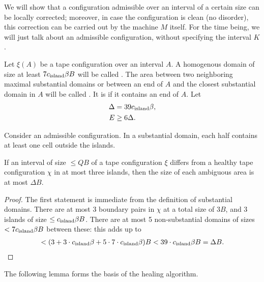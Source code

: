 \documentclass[11pt]{memoir}
\theoremstyle{definition} %
\renewcommand{\le}{\leq}
\renewcommand{\ge}{\geq}
\def\B{B}
\newcommand{\E}{E}
\newcommand{\Q}{Q}
\newcommand{\cns}[1]{c_{\textrm{\upshape #1}}}
\begin{document}
We will show that a configuration admissible over an interval of a certain size can be locally corrected;
moreover, in case the configuration is clean (no disorder), this correction
can be carried out by the machine \( M \) itself.
For the time being, we will just talk about an admissible configuration, without specifying the interval
\( K \).

\begin{definition}\label{def:substantial}
Let \( \xi(A) \) be a tape configuration over an interval \( A \).
A homogenous domain of size at least \( 7\cns{island}\beta\B \)
will be called .
The area between two neighboring maximal
substantial domains or between an end of \( A \) and the closest substantial domain in \( A \)
will be called .
It is  if it contains an end of \( A \).
  Let
 \begin{align*}
     \Delta &= 39\cns{island}\beta, %
\\  \E  &\ge 6\Delta. %
 \end{align*}
\end{definition}

\begin{lemma}\label{lem:ambiguous}
Consider an admissible configuration.
In a substantial domain, each half contains at least one cell outside the islands.

If an interval of size \( \le  \Q\B \) of a tape configuration \( \xi \) differs from a  healthy tape 
configuration \( \chi \) in at most three islands, then 
the size of each ambiguous area is at most \( \Delta\B \).
\end{lemma}
\begin{proof}
The first statement is immediate from the definition of substantial domains.
There are at most 3 boundary pairs in \( \chi \) at a total size of \( 3\B \), and
3 islands of size \( \le\cns{island}\beta\B \).
There are at most 5 non-substantial domains of sizes \( < 7\cns{island}\beta\B \)
between these: this adds up to
\begin{align*}
 < (3+3\cdot\cns{island}\beta+ 5\cdot 7\cdot\cns{island}\beta)\B<39\cdot\cns{island}\beta\B=\Delta\B.
 \end{align*}
\end{proof}

The following lemma forms the basis of the healing algorithm.
\end{document}
